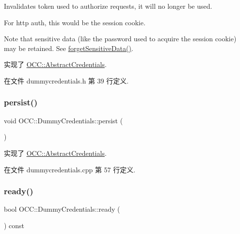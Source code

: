 Invalidates token used to authorize requests, it will no longer be used.

For http auth, this would be the session cookie.

Note that sensitive data (like the password used to acquire the session cookie) may be retained. See \hyperlink{class_o_c_c_1_1_dummy_credentials_abbe85cf8654a6828a8a86639c40b1d72}{forget\+Sensitive\+Data()}. 

实现了 \hyperlink{class_o_c_c_1_1_abstract_credentials_a9c5d9d0c3e4a8fc1ff8cf45efc2f0337}{O\+C\+C\+::\+Abstract\+Credentials}.



在文件 dummycredentials.\+h 第 39 行定义.

\mbox{\label{class_o_c_c_1_1_dummy_credentials_a6a0144c1c4d2db8ac9314d3c202ca643}} 
\subsubsection{\texorpdfstring{persist()}{persist()}}
{\footnotesize\ttfamily void O\+C\+C\+::\+Dummy\+Credentials\+::persist (\begin{DoxyParamCaption}{ }\end{DoxyParamCaption})\hspace{0.3cm}{\ttfamily [virtual]}}



实现了 \hyperlink{class_o_c_c_1_1_abstract_credentials_ab4af03be7d9e7e330345b8f13e67a544}{O\+C\+C\+::\+Abstract\+Credentials}.



在文件 dummycredentials.\+cpp 第 57 行定义.

\mbox{\label{class_o_c_c_1_1_dummy_credentials_a2702abfdea4b6d5158867fd66951fc3a}} 
\subsubsection{\texorpdfstring{ready()}{ready()}}
{\footnotesize\ttfamily bool O\+C\+C\+::\+Dummy\+Credentials\+::ready (\begin{DoxyParamCaption}{ }\end{DoxyParamCaption}) const\hspace{0.3cm}{\ttfamily [virtual]}}



